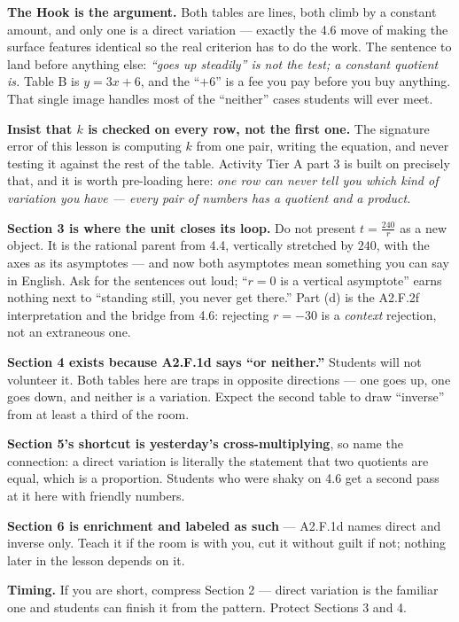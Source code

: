\documentclass[10pt]{article}
\begin{document}
\begin{teachernote}
\textbf{The Hook is the argument.} Both tables are lines, both climb by a constant amount, and only one
is a direct variation --- exactly the 4.6 move of making the surface features identical so the real
criterion has to do the work. The sentence to land before anything else: \emph{``goes up steadily'' is
not the test; a constant quotient is.} Table B is $y=3x+6$, and the ``$+6$'' is a fee you pay before you
buy anything. That single image handles most of the ``neither'' cases students will ever meet.

\vspace{3pt}
\textbf{Insist that $k$ is checked on every row, not the first one.} The signature error of this lesson
is computing $k$ from one pair, writing the equation, and never testing it against the rest of the
table. Activity Tier A part 3 is built on precisely that, and it is worth pre-loading here: \emph{one
row can never tell you which kind of variation you have --- every pair of numbers has a quotient and a
product.}

\vspace{3pt}
\textbf{Section 3 is where the unit closes its loop.} Do not present $t=\frac{240}{r}$ as a new object.
It is the rational parent from 4.4, vertically stretched by $240$, with the axes as its asymptotes ---
and now both asymptotes mean something you can say in English. Ask for the sentences out loud; ``$r=0$
is a vertical asymptote'' earns nothing next to ``standing still, you never get there.'' Part (d) is the
A2.F.2f interpretation and the bridge from 4.6: rejecting $r=-30$ is a \emph{context} rejection, not an
extraneous one.

\vspace{3pt}
\textbf{Section 4 exists because A2.F.1d says ``or neither.''} Students will not volunteer it. Both
tables here are traps in opposite directions --- one goes up, one goes down, and neither is a variation.
Expect the second table to draw ``inverse'' from at least a third of the room.

\vspace{3pt}
\textbf{Section 5's shortcut is yesterday's cross-multiplying}, so name the connection: a direct
variation is literally the statement that two quotients are equal, which is a proportion. Students who
were shaky on 4.6 get a second pass at it here with friendly numbers.

\vspace{3pt}
\textbf{Section 6 is enrichment and labeled as such} --- A2.F.1d names direct and inverse only. Teach it
if the room is with you, cut it without guilt if not; nothing later in the lesson depends on it.

\vspace{3pt}
\textbf{Timing.} If you are short, compress Section 2 --- direct variation is the familiar one and
students can finish it from the pattern. Protect Sections 3 and 4.
\end{teachernote}
\end{document}
